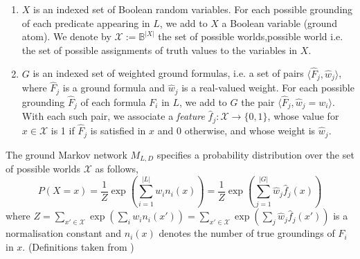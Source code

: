 \documentclass[12pt,a4paper]{article}
\newcommand{\lsym}{\textit}
\newtheorem{mydef}{Definition}
\begin{document}

\begin{enumerate}
    \setlength{\itemsep}{-0.5ex}
    \item
		$X$ is an indexed set of Boolean random variables. For each possible grounding of each predicate appearing
        in $L$, we add to $X$ a Boolean variable (ground atom).
		We denote by $\mathcal{X} := \mathds{B}^{|X|}$ the set of possible worlds,possible world
	 	i.e. the set of possible assignments of truth values to the variables in $X$.

		\vspace{1ex}
    \item
		$G$ is an indexed set of weighted ground formulas, i.e. a set of pairs $\langle \hat{F}_j, \hat{w}_j \rangle$, 
		where $\hat{F}_j$ is a ground formula and $\hat{w}_j$ is a real-valued weight.
		For each possible grounding $\hat{F}_j$ of each formula $F_i$ in $L$, we add to $G$ 
		the pair $\langle \hat{F}_j, \hat{w}_j = w_i\rangle$.
		With each such pair, we associate
		a \emph{feature} $\hat{f}_j : \mathcal{X} \rightarrow \{0,1\}$, whose value for $x\in \mathcal{X}$ is 1 if $\hat{F}_j$
		is satisfied in $x$ and 0 otherwise, and
		whose weight is $\hat{w}_j$.
\end{enumerate}
The ground Markov network $M_{L,D}$ specifies a probability distribution over 
the set of possible worlds $\mathcal{X}$ 
as follows,
\begin{equation}
		P(X=x) 
			= \frac{1}{Z}\exp\left(\sum_{i=1}^{|L|} {w}_i {n}_i(x)\right)
			= \frac{1}{Z}\exp\left(\sum_{j=1}^{|G|} \hat{w}_j \hat{f}_j(x)\right) 
\label{eq:mln:world-prob}
\end{equation}
where $Z=\sum_{x'\in\mathcal{X}} \exp\left(\sum_i w_i n_i(x')\right) = \sum_{x'\in\mathcal{X}} \exp\left(\sum_j \hat{w}_j \hat f_j(x')\right)$
is a normalisation constant and $n_i(x)$ denotes the number of true groundings of $F_i$ in $x$.
(Definitions taken from \cite{jain12phd})

\end{document}
